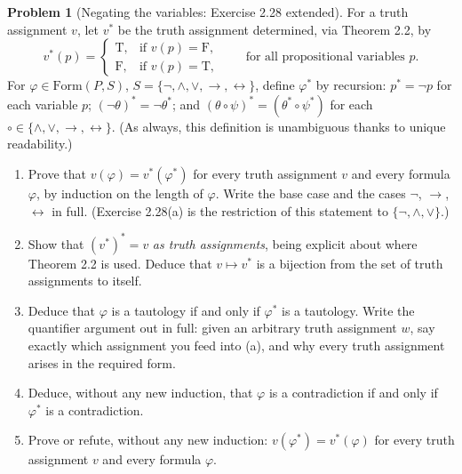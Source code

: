 \documentclass[11pt]{article}
\newcommand{\Form}{\mathrm{Form}}
\newcommand{\T}{\mathrm{T}}
\newcommand{\F}{\mathrm{F}}
\newcommand{\Sfive}{\{\lnot,\land,\lor,\to,\leftrightarrow\}}
\theoremstyle{definition}
\newtheorem{problem}{Problem}
\begin{document}
\begin{problem}[Negating the variables: Exercise 2.28 extended]
For a truth assignment $v$, let $v^*$ be the truth assignment determined, via
Theorem 2.2, by
\[
v^*(p)=\begin{cases}\T,&\text{if }v(p)=\F,\\[2pt] \F,&\text{if }v(p)=\T,\end{cases}
\qquad\text{for all propositional variables }p.
\]
For $\varphi\in\Form(P,S)$, $S=\Sfive$, define $\varphi^*$ by recursion:
$p^*=\lnot p$ for each variable $p$; $(\lnot\theta)^*=\lnot\theta^*$; and
$(\theta\circ\psi)^*=(\theta^*\circ\psi^*)$ for each
$\circ\in\{\land,\lor,\to,\leftrightarrow\}$. (As always, this definition is
unambiguous thanks to unique readability.)
\begin{enumerate}
\item[(a)] Prove that $v(\varphi)=v^*(\varphi^*)$ for every truth assignment $v$
and every formula $\varphi$, by induction on the length of $\varphi$. Write the
base case and the cases $\lnot$, $\to$, $\leftrightarrow$ in full. (Exercise
2.28(a) is the restriction of this statement to $\{\lnot,\land,\lor\}$.)
\item[(b)] Show that $(v^*)^*=v$ \emph{as truth assignments}, being explicit about
where Theorem 2.2 is used. Deduce that $v\mapsto v^*$ is a bijection from the set
of truth assignments to itself.
\item[(c)] Deduce that $\varphi$ is a tautology if and only if $\varphi^*$ is a
tautology. Write the quantifier argument out in full: given an arbitrary truth
assignment $w$, say exactly which assignment you feed into (a), and why every
truth assignment arises in the required form.
\item[(d)] Deduce, without any new induction, that $\varphi$ is a contradiction if
and only if $\varphi^*$ is a contradiction.
\item[(e)] Prove or refute, without any new induction:
$v(\varphi^*)=v^*(\varphi)$ for every truth assignment $v$ and every formula
$\varphi$.
\end{enumerate}
\end{problem}
\end{document}

